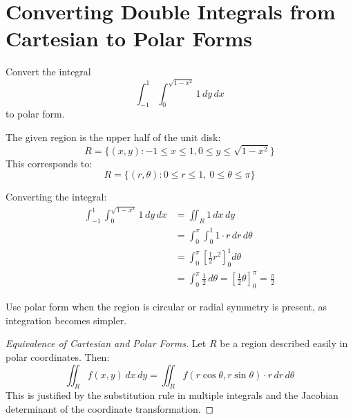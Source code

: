 \section{Converting Double Integrals from Cartesian to Polar Forms}
\label{sec:converting-double-integrals-from-cartesian-to-polar-forms}

\begin{exercise}
  Convert the integral
  \[
    \int_{-1}^{1} \int_{0}^{\sqrt{1-x^2}} 1\,dy\,dx
  \]
  to polar form.
\end{exercise}

\begin{answer}
  The given region is the upper half of the unit disk:
  \[
    R = \{ (x,y): -1 \le x \le 1, 0 \le y \le \sqrt{1 - x^2} \}
  \]
  This corresponds to:
  \[
    R = \{ (r,\theta): 0 \le r \le 1,\ 0 \le \theta \le \pi \}
  \]

  Converting the integral:
  \begin{align*}
    \int_{-1}^{1} \int_{0}^{\sqrt{1-x^2}} 1\,dy\,dx 
    &= \iint_R 1\,dx\,dy \\
    &= \int_0^{\pi} \int_0^1 1 \cdot r\,dr\,d\theta \\
    &= \int_0^{\pi} \left[ \frac{1}{2}r^2 \right]_0^1 d\theta \\
    &= \int_0^{\pi} \frac{1}{2}\,d\theta = \left[ \frac{1}{2}\theta \right]_0^{\pi} = \frac{\pi}{2}
  \end{align*}
\end{answer}

\begin{remark}
  Use polar form when the region is circular or radial symmetry is present, as integration becomes simpler.
\end{remark}

\begin{proof}[Equivalence of Cartesian and Polar Forms]
  Let \(R\) be a region described easily in polar coordinates. Then:
  \[
    \iint_R f(x,y)\,dx\,dy = \iint_R f(r\cos\theta, r\sin\theta)\cdot r\,dr\,d\theta
  \]
  This is justified by the substitution rule in multiple integrals and the Jacobian determinant of the coordinate transformation.
\end{proof}
